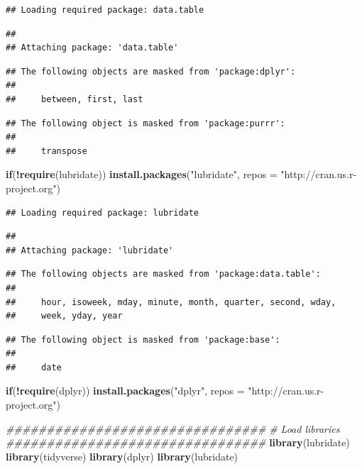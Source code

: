 \documentclass[]{article}
\newenvironment{Shaded}{\begin{snugshade}}{\end{snugshade}}
\newcommand{\CommentTok}[1]{\textcolor[rgb]{0.56,0.35,0.01}{\textit{#1}}}
\newcommand{\ControlFlowTok}[1]{\textcolor[rgb]{0.13,0.29,0.53}{\textbf{#1}}}
\newcommand{\DataTypeTok}[1]{\textcolor[rgb]{0.13,0.29,0.53}{#1}}
\newcommand{\KeywordTok}[1]{\textcolor[rgb]{0.13,0.29,0.53}{\textbf{#1}}}
\newcommand{\NormalTok}[1]{#1}
\newcommand{\OperatorTok}[1]{\textcolor[rgb]{0.81,0.36,0.00}{\textbf{#1}}}
\newcommand{\StringTok}[1]{\textcolor[rgb]{0.31,0.60,0.02}{#1}}
\begin{document}
\begin{verbatim}
## Loading required package: data.table
\end{verbatim}

\begin{verbatim}
## 
## Attaching package: 'data.table'
\end{verbatim}

\begin{verbatim}
## The following objects are masked from 'package:dplyr':
## 
##     between, first, last
\end{verbatim}

\begin{verbatim}
## The following object is masked from 'package:purrr':
## 
##     transpose
\end{verbatim}

\begin{Shaded}
\begin{Highlighting}[]
\ControlFlowTok{if}\NormalTok{(}\OperatorTok{!}\KeywordTok{require}\NormalTok{(lubridate)) }\KeywordTok{install.packages}\NormalTok{(}\StringTok{"lubridate"}\NormalTok{, }\DataTypeTok{repos =} \StringTok{"http://cran.us.r-project.org"}\NormalTok{)}
\end{Highlighting}
\end{Shaded}

\begin{verbatim}
## Loading required package: lubridate
\end{verbatim}

\begin{verbatim}
## 
## Attaching package: 'lubridate'
\end{verbatim}

\begin{verbatim}
## The following objects are masked from 'package:data.table':
## 
##     hour, isoweek, mday, minute, month, quarter, second, wday,
##     week, yday, year
\end{verbatim}

\begin{verbatim}
## The following object is masked from 'package:base':
## 
##     date
\end{verbatim}

\begin{Shaded}
\begin{Highlighting}[]
\ControlFlowTok{if}\NormalTok{(}\OperatorTok{!}\KeywordTok{require}\NormalTok{(dplyr)) }\KeywordTok{install.packages}\NormalTok{(}\StringTok{"dplyr"}\NormalTok{, }\DataTypeTok{repos =} \StringTok{"http://cran.us.r-project.org"}\NormalTok{)}


\CommentTok{################################}
\CommentTok{# Load libraries}
\CommentTok{################################}
\KeywordTok{library}\NormalTok{(lubridate)}
\KeywordTok{library}\NormalTok{(tidyverse)}
\KeywordTok{library}\NormalTok{(dplyr)}
\KeywordTok{library}\NormalTok{(lubridate)}
\end{Highlighting}
\end{Shaded}
\end{document}
